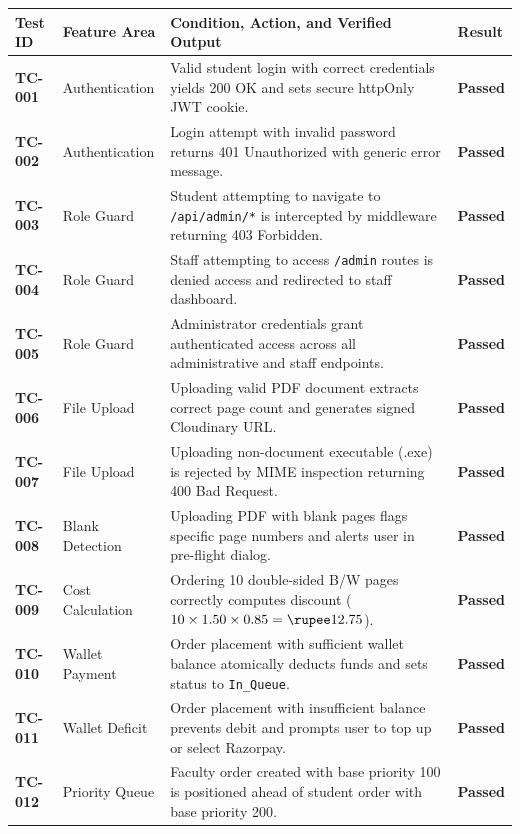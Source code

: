 \documentclass[12pt,a4paper,oneside]{report}
\begin{document}
\begin{table}[H]
\centering
\small
\begin{tabularx}{\textwidth}{|p{0.55in}|p{1.2in}|X|p{0.6in}|}
\hline
\textbf{Test ID} & \textbf{Feature Area} & \textbf{Condition, Action, and Verified Output} & \textbf{Result} \\ \hline
\textbf{TC-001} & Authentication & Valid student login with correct credentials yields 200 OK and sets secure httpOnly JWT cookie. & \textbf{Passed} \\ \hline
\textbf{TC-002} & Authentication & Login attempt with invalid password returns 401 Unauthorized with generic error message. & \textbf{Passed} \\ \hline
\textbf{TC-003} & Role Guard & Student attempting to navigate to \texttt{/api/admin/*} is intercepted by middleware returning 403 Forbidden. & \textbf{Passed} \\ \hline
\textbf{TC-004} & Role Guard & Staff attempting to access \texttt{/admin} routes is denied access and redirected to staff dashboard. & \textbf{Passed} \\ \hline
\textbf{TC-005} & Role Guard & Administrator credentials grant authenticated access across all administrative and staff endpoints. & \textbf{Passed} \\ \hline
\textbf{TC-006} & File Upload & Uploading valid PDF document extracts correct page count and generates signed Cloudinary URL. & \textbf{Passed} \\ \hline
\textbf{TC-007} & File Upload & Uploading non-document executable (.exe) is rejected by MIME inspection returning 400 Bad Request. & \textbf{Passed} \\ \hline
\textbf{TC-008} & Blank Detection & Uploading PDF with blank pages flags specific page numbers and alerts user in pre-flight dialog. & \textbf{Passed} \\ \hline
\textbf{TC-009} & Cost Calculation & Ordering 10 double-sided B/W pages correctly computes discount ($10 \times 1.50 \times 0.85 = \text{\rupee}12.75$). & \textbf{Passed} \\ \hline
\textbf{TC-010} & Wallet Payment & Order placement with sufficient wallet balance atomically deducts funds and sets status to \texttt{In\_Queue}. & \textbf{Passed} \\ \hline
\textbf{TC-011} & Wallet Deficit & Order placement with insufficient balance prevents debit and prompts user to top up or select Razorpay. & \textbf{Passed} \\ \hline
\textbf{TC-012} & Priority Queue & Faculty order created with base priority 100 is positioned ahead of student order with base priority 200. & \textbf{Passed} \\ \hline

\end{tabularx}
\end{table}
\end{document}

